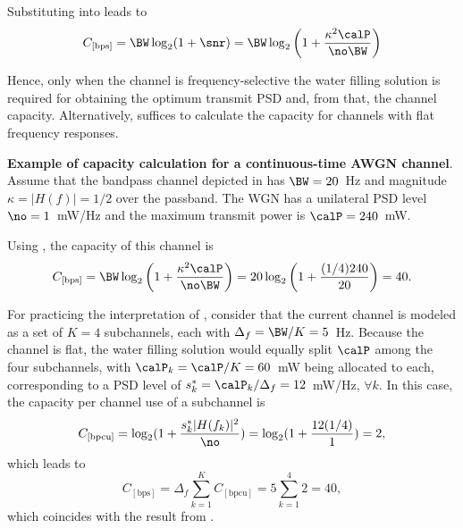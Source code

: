 Substituting  into  leads to
\begin{equation}
C_{[\textrm{bps}]} = \BW \log_2 (1 + \snr) = \BW \log_2 \left(1 + \frac{\kappa^2 \calP}{\no \BW } \right)
\label{eq:awgnChannelCapacityTransmitPower}
\end{equation}

Hence, only when the channel is frequency-selective the water filling solution is required for obtaining the optimum transmit PSD and, from that, the channel capacity. Alternatively,  suffices to calculate the capacity for channels with flat frequency responses.



\bExample \textbf{Example of capacity calculation for a continuous-time AWGN channel}.
\label{exa:flatChannels}
Assume that the bandpass channel depicted in  has $\BW=20$~Hz and magnitude $\kappa=|H(f)| = 1/2$ over the passband. The WGN has a unilateral PSD level $\no=1$~mW/Hz and the maximum transmit power is $\calP=240$~mW.

Using , the capacity of this channel is
\[
C_{[\textrm{bps}]} = \BW \log_2 \left(1 + \frac{\kappa^2 \calP}{\no \BW } \right) = 20 \log_2 \left(1 + \frac{(1/4) 240}{20} \right) = 40.
\]

For practicing the interpretation of , consider that the current channel is modeled as a set of $K=4$ subchannels, each with $\Delta_f = \BW/K = 5$~Hz.
Because the channel is flat, the water filling solution would equally split $\calP$ among the four subchannels, with $\calP_k = \calP/K = 60$~mW being allocated to each, corresponding to a PSD level of $s_k^* = \calP_k/\Delta_f = 12$~mW/Hz, $\forall k$. In this case, the capacity per channel use of a subchannel is
\[
C_{[\textrm{bpcu}]} = \log_2 (1 + \frac{s_k^* |H(f_k)|^2}{\no}) = \log_2 (1 + \frac{12 (1/4)}{1}) = 2,
\]
which leads to
\[
C_{[\textrm{bps}]} = \Delta_f \sum_{k=1}^K C_{[\textrm{bpcu}]} = 5 \sum_{k=1}^4 2 = 40,
\]
which coincides with the result from .
\eExample

